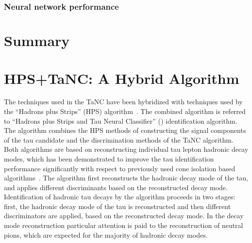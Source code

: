 \subsubsection{Neural network performance}

\section{Summary}


\section{HPS+TaNC: A Hybrid Algorithm}
\label{sec:TauId} 
%
The techniques used in the TaNC have been hybridized with techniques used by the
``Hadrons plus Strips'' (HPS) algorithm~\cite{CMS_AN_2010-082}.  The combined
algorithm is referred to ``Hadrons plus Strips and Tau Neural Classifier''
(\hpsTanc) identification algorithm.  The algorithm combines the HPS methods of
constructing the signal components of the tau candidate and the discrimination
methods of the TaNC algorithm.  Both algorithms are based on reconstructing
individual tau lepton hadronic decay modes, which has been demonstrated to
improve the tau identification performance significantly with respect to
previously used cone isolation based algorithms~\cite{CMS-PAS-PFT-10-004}.  The
\hpsTanc algorithm first reconstructs the hadronic decay mode of the tau, and
applies different discriminants based on the reconstructed decay mode.
Identification of hadronic tau decays by the \hpsTanc algorithm proceeds in two
stages: first, the hadronic decay mode of the tau is reconstructed and then
different discriminators are applied, based on the reconstructed decay mode.  In
the decay mode reconstruction particular attention is paid to the reconstruction
of neutral pions, which are expected for the majority of hadronic decay modes.

